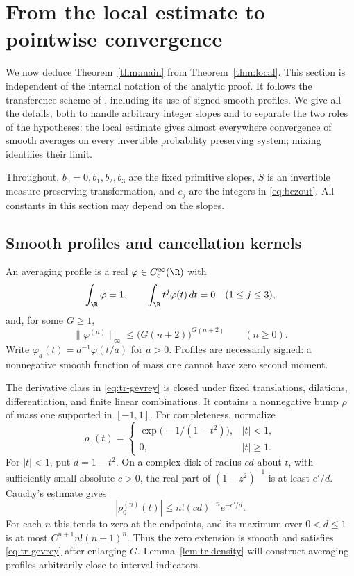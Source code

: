 \section{From the local estimate to pointwise convergence}
\label{sec:transfer}

We now deduce Theorem~\ref{thm:main} from Theorem~\ref{thm:local}.
This section is independent of the internal notation of the analytic
proof.  It follows the transference scheme of
\cite[Sections~2--3]{V}, including its use of signed smooth profiles.
We give all the details, both to handle arbitrary integer slopes and to
separate the two roles of the hypotheses: the local estimate gives
almost everywhere convergence of smooth averages on every invertible
probability preserving system; mixing identifies their limit.

Throughout, \(b_0=0,b_1,b_2,b_3\) are the fixed primitive slopes,
\(S\) is an invertible measure-preserving transformation, and
\(e_j\) are the integers in \eqref{eq:bezout}.  All constants in
this section may depend on the slopes.

\subsection{Smooth profiles and cancellation kernels}

\begin{definition}
\label{def:tr-profile}
An averaging profile is a real \(\varphi\in C_c^\infty(\R)\) with
\begin{equation}
 \int_\R\varphi=1,
 \qquad \int_\R t^j\varphi(t)\,dt=0\quad(1\leq j\leq3),
 \label{eq:tr-moments}
\end{equation}
and, for some \(G\geq1\),
\begin{equation}
 \|\varphi^{(n)}\|_\infty
 \leq \bigl(G(n+2)\bigr)^{G(n+2)}\qquad(n\geq0).
 \label{eq:tr-gevrey}
\end{equation}
Write \(\varphi_a(t)=a^{-1}\varphi(t/a)\) for \(a>0\).
Profiles are necessarily signed: a nonnegative smooth function of
mass one cannot have zero second moment.
\end{definition}

The derivative class in \eqref{eq:tr-gevrey} is closed under fixed
translations, dilations, differentiation, and finite linear combinations.
It contains a nonnegative bump \(\rho\) of mass one supported in
\([-1,1]\).  For completeness, normalize
\[
 \rho_0(t)=
 \begin{cases}
  \exp\bigl(-1/(1-t^2)\bigr),& |t|<1,\\
  0,& |t|\geq1.
 \end{cases}
\]
For \(|t|<1\), put \(d=1-t^2\).  On a complex disk of radius \(cd\)
about \(t\), with sufficiently small absolute \(c>0\), the real part
of \((1-z^2)^{-1}\) is at least \(c'/d\).  Cauchy's estimate gives
\[
 |\rho_0^{(n)}(t)|\leq n!(cd)^{-n}e^{-c'/d}.
\]
For each \(n\) this tends to zero at the endpoints, and its maximum
over \(0<d\leq1\) is at most \(C^{n+1}n!(n+1)^n\).  Thus the zero
extension is smooth and satisfies \eqref{eq:tr-gevrey} after enlarging
\(G\).  Lemma~\ref{lem:tr-density} will construct averaging profiles
arbitrarily close to interval indicators.

